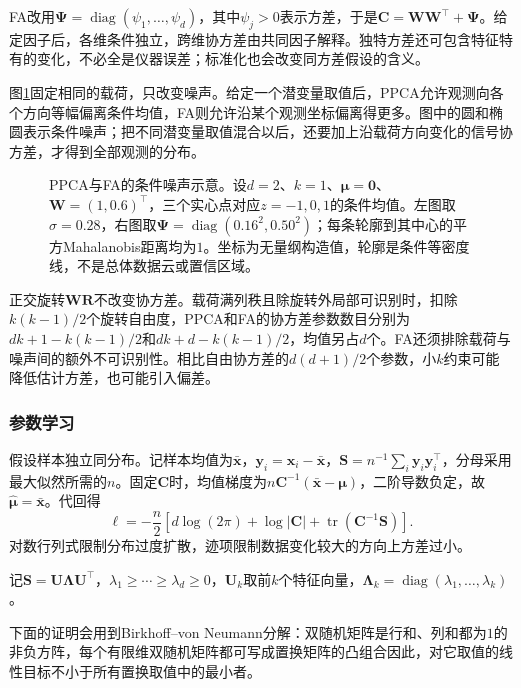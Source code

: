 FA改用$\bm{\Psi}=\operatorname{diag}(\psi_1,\ldots,\psi_d)$，其中$\psi_j>0$表示方差，于是$\bm{C}=\bm{W}\bm{W}^\top+\bm{\Psi}$。给定因子后，各维条件独立，跨维协方差由共同因子解释。独特方差还可包含特征特有的变化，不必全是仪器误差；标准化也会改变同方差假设的含义。

图\ref{fig:dim-ppca-fa-noise}固定相同的载荷，只改变噪声。给定一个潜变量取值后，PPCA允许观测向各个方向等幅偏离条件均值，FA则允许沿某个观测坐标偏离得更多。图中的圆和椭圆表示条件噪声；把不同潜变量取值混合以后，还要加上沿载荷方向变化的信号协方差，才得到全部观测的分布。

\begin{figure}[htbp]
  \centering
  
  \caption{PPCA与FA的条件噪声示意。设$d=2$、$k=1$、$\bm{\mu}=\bm{0}$、$\bm{W}=(1,0.6)^\top$，三个实心点对应$z=-1,0,1$的条件均值。左图取$\sigma=0.28$，右图取$\bm{\Psi}=\operatorname{diag}(0.16^2,0.50^2)$；每条轮廓到其中心的平方Mahalanobis距离均为$1$。坐标为无量纲构造值，轮廓是条件等密度线，不是总体数据云或置信区域。}
  \label{fig:dim-ppca-fa-noise}
\end{figure}

正交旋转$\bm{W}\bm{R}$不改变协方差。载荷满列秩且除旋转外局部可识别时，扣除$k(k-1)/2$个旋转自由度，PPCA和FA的协方差参数数目分别为$dk+1-k(k-1)/2$和$dk+d-k(k-1)/2$，均值另占$d$个。FA还须排除载荷与噪声间的额外不可识别性。相比自由协方差的$d(d+1)/2$个参数，小$k$约束可能降低估计方差，也可能引入偏差。

\subsubsection{参数学习}
\label{sec:dim-ppca-learning}

假设样本独立同分布。记样本均值为$\bar{\bm{x}}$，$\bm{y}_i=\bm{x}_i-\bar{\bm{x}}$，$\bm{S}=n^{-1}\sum_i\bm{y}_i\bm{y}_i^\top$，分母采用最大似然所需的$n$。固定$\bm{C}$时，均值梯度为$n\bm{C}^{-1}(\bar{\bm{x}}-\bm{\mu})$，二阶导数负定，故$\hat{\bm{\mu}}=\bar{\bm{x}}$。代回得
\begin{equation}
\label{eq:dim-ppca-likelihood}
\ell=-\frac{n}{2}\left[
d\log(2\pi)+\log|\bm{C}|
+\operatorname{tr}(\bm{C}^{-1}\bm{S})\right].
\end{equation}
对数行列式限制分布过度扩散，迹项限制数据变化较大的方向上方差过小。

记$\bm{S}=\bm{U}\bm{\Lambda}\bm{U}^\top$，$\lambda_1\geq\cdots\geq\lambda_d\geq0$，$\bm{U}_k$取前$k$个特征向量，$\bm{\Lambda}_k=\operatorname{diag}(\lambda_1,\ldots,\lambda_k)$。

下面的证明会用到Birkhoff--von Neumann分解：双随机矩阵是行和、列和都为$1$的非负方阵，每个有限维双随机矩阵都可写成置换矩阵的凸组合因此，对它取值的线性目标不小于所有置换取值中的最小者。

